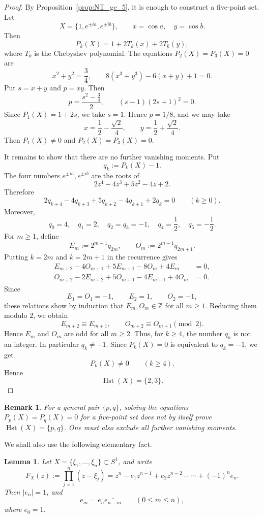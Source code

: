 \documentclass{amsart}
\newtheorem{lem}[thm]{Lemma}
\newtheorem{rem}[thm]{Remark}
\theoremstyle{definition}
\DeclareMathOperator{\Hst}{Hst}
\begin{document}
\begin{proof}
By Proposition~\ref{prop:NT_ge_5}, it is enough to construct a five-point
set.  Let
\[
X=\{1,e^{\pm ia},e^{\pm ib}\},
\qquad
x=\cos a,\quad y=\cos b.
\]
Then
\[
P_k(X)=1+2T_k(x)+2T_k(y),
\]
where \(T_k\) is the Chebyshev polynomial.  The equations
\(P_2(X)=P_3(X)=0\) are
\[
x^2+y^2=\frac34,
\qquad
8(x^3+y^3)-6(x+y)+1=0.
\]
Put \(s=x+y\) and \(p=xy\). Then
\[
p=\frac{s^2-\frac34}{2},
\qquad
(s-1)(2s+1)^2=0.
\]
Since \(P_1(X)=1+2s\), we take \(s=1\). Hence \(p=1/8\), and we may take
\[
x=\frac12-\frac{\sqrt2}{4},
\qquad
y=\frac12+\frac{\sqrt2}{4}.
\]
Then \(P_1(X)\neq0\) and \(P_2(X)=P_3(X)=0\).

It remains to show that there are no further vanishing moments. Put
\[
q_k:=P_k(X)-1.
\]
The four numbers \(e^{\pm ia},e^{\pm ib}\) are the roots of
\[
2z^4-4z^3+5z^2-4z+2.
\]
Therefore
\[
2q_{k+4}-4q_{k+3}+5q_{k+2}-4q_{k+1}+2q_k=0
\qquad(k\ge0).
\]
Moreover,
\[
q_0=4,\quad q_1=2,\quad q_2=q_3=-1,\quad q_4=\frac12,\quad q_5=-\frac12.
\]
For \(m\ge1\), define
\[
E_m:=2^{m-1}q_{2m},
\qquad
O_m:=2^{m-1}q_{2m+1}.
\]
Putting \(k=2m\) and \(k=2m+1\) in the recurrence gives
\begin{align*}
E_{m+2}-4O_{m+1}+5E_{m+1}-8O_m+4E_m&=0,\\
O_{m+2}-2E_{m+2}+5O_{m+1}-4E_{m+1}+4O_m&=0.
\end{align*}
Since
\[
E_1=O_1=-1,\qquad E_2=1,\qquad O_2=-1,
\]
these relations show by induction that \(E_m,O_m\in\mathbb Z\) for all
\(m\ge1\). Reducing them modulo \(2\), we obtain
\[
E_{m+2}\equiv E_{m+1},
\qquad
O_{m+2}\equiv O_{m+1}
\pmod 2.
\]
Hence \(E_m\) and \(O_m\) are odd for all \(m\ge2\).
Thus, for \(k\ge4\), the number \(q_k\) is not an integer. In particular
\(q_k\neq-1\). Since \(P_k(X)=0\) is equivalent to \(q_k=-1\), we get
\[
P_k(X)\neq0\qquad(k\ge4).
\]
Hence
\[
\Hst(X)=\{2,3\}.
\]
\end{proof}

\begin{rem}
For a general pair \(\{p,q\}\), solving the equations
\(P_p(X)=P_q(X)=0\) for a five-point set does not by itself prove
\(\Hst(X)=\{p,q\}\).  One must also exclude all further vanishing moments.
\end{rem}

We shall also use the following elementary fact.

\begin{lem}\label{lem:unit-circle-coefficients}
Let \(X=\{\xi_1,\dots,\xi_n\}\subset S^1\), and write
\[
F_X(z):=\prod_{j=1}^n(z-\xi_j)
=z^n-e_1z^{n-1}+e_2z^{n-2}-\cdots+(-1)^ne_n.
\]
Then \(|e_n|=1\), and
\[
e_m=e_n\overline{e_{n-m}}
\qquad(0\le m\le n),
\]
where \(e_0=1\).
\end{lem}
\end{document}
